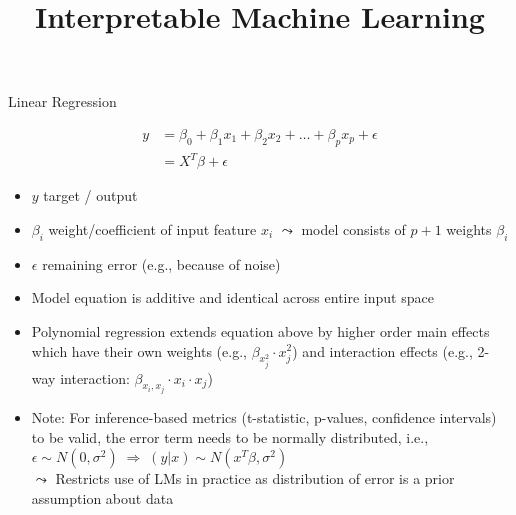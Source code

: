 \documentclass[11pt,compress,t,notes=noshow, aspectratio=169, xcolor=table]{beamer}
\title{Interpretable Machine Learning}
\date{}
\begin{document}
\newcommand{\titlefigure}{figure/whitebox}
\newcommand{\learninggoals}{
\item What characteristics does an interpretable model have?
\item Why should we use interpretable models at all?
\item Examples for interpretable models.}





\begin{frame}[c]{Linear Regression}

\begin{align*}
y &= \beta_0 + \beta_1 x_1 + \beta_2 x_2 + \dots + \beta_p x_p + \epsilon \\
 &= X^T\beta + \epsilon
\end{align*}

    \begin{itemize}
        \item $y$ target / output
        \item $\beta_i$ weight/coefficient of input feature $x_i$ $\leadsto$ model consists of $p+1$ weights $\beta_i$
        \item $\epsilon$ remaining error (e.g., because of noise)
        \item Model equation is additive and identical across entire input space
        \pause
        \item Polynomial regression extends equation above by higher order main effects which have their own weights (e.g., $\beta_{x_j^2} \cdot x_j^2$) and interaction effects (e.g., 2-way interaction: $\beta_{x_i, x_j} \cdot x_i \cdot x_j$)
        \item Note: For inference-based metrics (t-statistic, p-values, confidence intervals) to be valid, the error term needs to be normally distributed, i.e., $\epsilon \sim N(0, \sigma^2) \; \Rightarrow \; (y \vert x) \sim N(x^T \beta, \sigma^2)$\\
$\leadsto$ Restricts use of LMs in practice as distribution of error is a prior assumption about data
    \end{itemize}


\end{frame}
\end{document}
